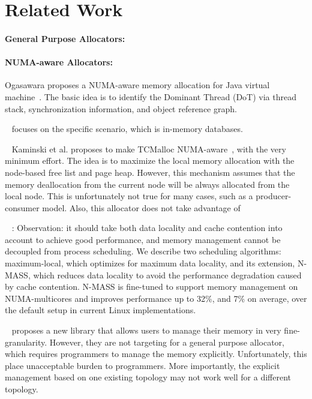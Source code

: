 \section{Related Work}

\paragraph{General Purpose Allocators:}

\paragraph{NUMA-aware Allocators:} 

Ogasawara proposes a NUMA-aware memory allocation for Java virtual machine~\cite{Ogasawara:2009:NMM:1640089.1640117}. The basic idea is to identify the Dominant Thread (DoT) via thread stack, synchronization information, and object reference graph.  

~\cite{wagle2015numa} focuses on the specific scenario, which is in-memory databases. 

~\cite{1419934}
Kaminski et al. proposes to make TCMalloc NUMA-aware~\cite{tcmallocnew}, with the very minimum effort. The idea is to maximize the local memory allocation with the node-based free list and page heap. However, this mechanism assumes that the memory deallocation from the current node will be always allocated from the local node. This is unfortunately not true for many cases, such as a producer-consumer model. Also, this allocator does not take advantage of 

~\cite{Majo:2011:MMN:1993478.1993481} :
Observation: it should take both data locality and cache contention into account to achieve good performance, and memory management cannot be decoupled from process scheduling. 
We describe two scheduling algorithms: maximum-local, which optimizes for maximum data locality, and its extension, N-MASS, which reduces data locality to avoid the performance degradation caused by cache contention. N-MASS is fine-tuned to support memory management on NUMA-multicores and improves performance up to 32\%, and 7\% on average, over the default setup in current Linux implementations.

~\cite{cantalupo2015memkind} proposes a new library that allows users to manage their memory in very fine-granularity. However, they are not targeting for a general purpose allocator, which requires programmers to manage the memory explicitly. Unfortunately, this place unacceptable burden to programmers. More importantly, the explicit management based on one existing topology may not work well for a different topology. 



